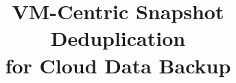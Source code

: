 \documentclass[conference]{IEEEtran}
\newcommand{\comments}[1]{}
\begin{document}
\setlength{\pdfpageheight}{\paperheight}
\setlength{\pdfpagewidth}{\paperwidth}

\title{VM-Centric Snapshot Deduplication\\ for Cloud Data Backup}
\comments{
\authorinfo{Wei Zhang\and Daniel Agun\and Tao Yang}
           {UC Santa Barbara}
           {\{wei,dagun,tyang\}@cs.ucsb.edu}
\authorinfo{Hong Tang}
           {Alibaba Inc.}
           {hongtang@alibaba-inc.com}
\authorinfo{Rich Wolski}
           {UC Santa Barbara}
           {rich@cs.ucsb.edu}
}

\comments{
 \authorinfo{
   Wei Zhang$^{\star\ast}$, Daniel Agun$^\star$, Tao Yang$^\star$, Rich Wolski$^{\star}$, and  
Hong Tang$^\dagger$\\
   $^\star$University of California at Santa Barbara \ \ \  \\
   $^\ast$Pure Storage Inc.\ \ \  $^\dagger$Alibaba Inc. }

}

\author{

}
\maketitle
\end{document}
